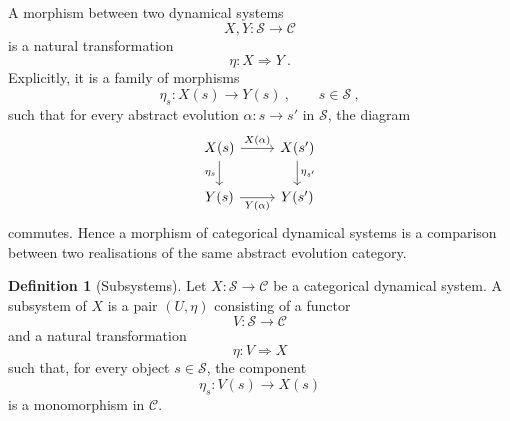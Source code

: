 \documentclass[a4paper,reqno,oneside]{amsart}
\theoremstyle{definition}
\newtheorem{definition}[theorem]{Definition}
\theoremstyle{remark}
\numberwithin{equation}{section}
\begin{document}
	
	A morphism between two dynamical systems
	\begin{equation}
		X,Y\colon \mathcal S\to\mathcal C
	\end{equation}
	is a natural transformation
	\begin{equation}
		\eta\colon X\Longrightarrow Y \ .
	\end{equation}
	Explicitly, it is a family of morphisms
	\begin{equation}
		\eta_s\colon X(s)\longrightarrow Y(s) \ ,
		\qquad s\in\mathcal S \ ,
	\end{equation}
	such that for every abstract evolution $\alpha\colon s\to s'$ in
	$\mathcal S$, the diagram
	\begin{equation}
		\begin{tikzcd}
			X(s) \arrow[r,"X(\alpha)"] \arrow[d,"\eta_s"'] 
			& X(s') \arrow[d,"\eta_{s'}"] \\
			Y(s) \arrow[r,"Y(\alpha)"'] 
			& Y(s')
		\end{tikzcd}
	\end{equation}
	commutes. Hence a morphism of categorical dynamical systems is a comparison
	between two realisations of the same abstract evolution category.
	
	
	
	\begin{definition}[Subsystems]
		Let $X\colon \mathcal S\to\mathcal C$ be a categorical dynamical system. A subsystem of $X$ is a pair $(U, \eta)$ consisting of a functor
		\begin{equation}
			V\colon \mathcal S\to\mathcal C
		\end{equation}
		and a natural transformation
		\begin{equation}
			\eta\colon V\Longrightarrow X
		\end{equation}
		such that, for every object $s\in\mathcal S$, the component
		\begin{equation}
			\eta_s\colon V(s)\longrightarrow X(s)
		\end{equation}
		is a monomorphism in $\mathcal C$.
	\end{definition}
	
	
	
\end{document}
